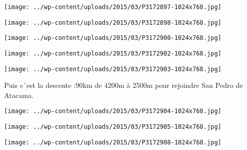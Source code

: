  

\begin{center} \texttt{[image: ../wp-content/uploads/2015/03/P3172897-1024x768.jpg]} \end{center}



 

\begin{center} \texttt{[image: ../wp-content/uploads/2015/03/P3172898-1024x768.jpg]} \end{center}



 

\begin{center} \texttt{[image: ../wp-content/uploads/2015/03/P3172900-1024x768.jpg]} \end{center}



 

\begin{center} \texttt{[image: ../wp-content/uploads/2015/03/P3172902-1024x768.jpg]} \end{center}



 

\begin{center} \texttt{[image: ../wp-content/uploads/2015/03/P3172903-1024x768.jpg]} \end{center}

 

 Puis c´est la descente :90km de 4200m à 2500m pour rejoindre San Pedro de Atacama. 

 

\begin{center} \texttt{[image: ../wp-content/uploads/2015/03/P3172904-1024x768.jpg]} \end{center}



 

\begin{center} \texttt{[image: ../wp-content/uploads/2015/03/P3172905-1024x768.jpg]} \end{center}



 

\begin{center} \texttt{[image: ../wp-content/uploads/2015/03/P3172908-1024x768.jpg]} \end{center}



